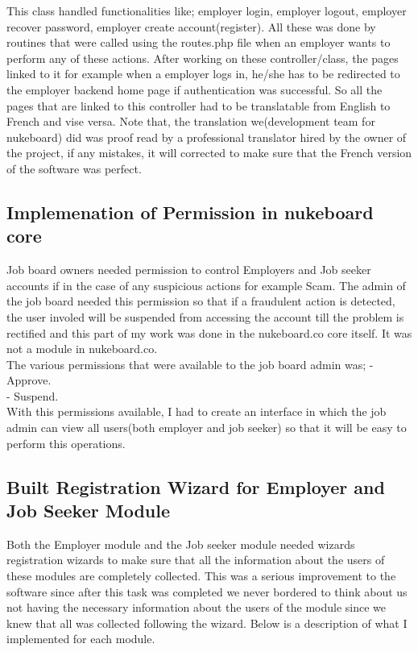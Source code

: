 This class handled functionalities like; employer login, employer logout, employer recover password, employer create account(register). All these was done by routines that were called using the routes.php file when an employer wants to perform any of these actions. After working on these controller/class, the pages linked to it for example when a employer logs in, he/she has to be redirected to the employer backend home page if authentication was successful. So all the pages that are linked to this controller had to be translatable from English to French and vise versa. Note that, the translation we(development team for nukeboard) did was proof read by a professional translator hired by the owner of the project, if any mistakes, it will corrected to make sure that the French version of the software was perfect.

\subsection{Implemenation of Permission in nukeboard core}

Job board owners needed permission to control Employers and Job seeker accounts if in the case of any suspicious actions for example Scam. The admin of the job board needed this permission so that if a fraudulent action is detected, the user involed will be suspended from accessing the account till the problem is rectified and this part of my work was done in the nukeboard.co core itself. It was not a module in nukeboard.co. \\

The various permissions that were available to the job board admin was; 
- Approve. \\
- Suspend. \\

With this permissions available, I had to create an interface in which the job admin can view all users(both employer and job seeker) so that it will be easy to perform this operations.

\subsection{Built Registration Wizard for Employer and Job Seeker Module}

Both the Employer module and the Job seeker module needed wizards registration wizards to make sure that all the information about the users of these modules are completely collected. This was a serious improvement to the software since after this task was completed we never bordered to think about us not having the necessary information about the users of the module since we knew that all was collected following the wizard. Below is a description of what I implemented for each module.

